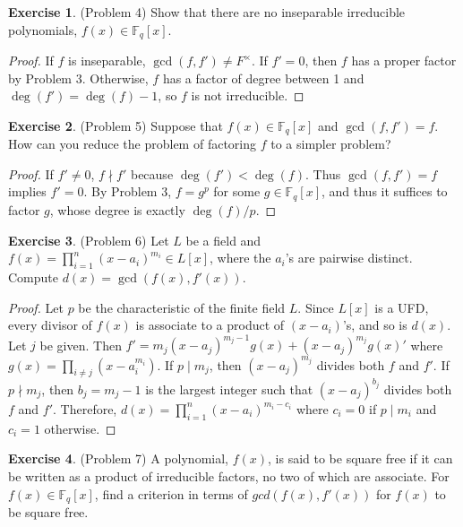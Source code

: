 \documentclass[12pt, psamsfonts]{amsart}
\theoremstyle{definition}
\newtheorem*{exer}{Exercise}
\theoremstyle{remark}
\numberwithin{equation}{section}
\begin{document}
\begin{exer}{(Problem 4)}
  Show that there are no inseparable irreducible polynomials, $f(x) \in \mathbb{F}_q[x]$.
\end{exer}

\begin{proof}
  If $f$ is inseparable, $\gcd(f, f') \ne F^{\times}$.
  If $f' = 0$, then $f$ has a proper factor by Problem 3.
  Otherwise, $f$ has a factor of degree between 1 and $\deg(f') = \deg(f) - 1$, so $f$ is not irreducible.
\end{proof}

\begin{exer}{(Problem 5)}
  Suppose that $f(x) \in \mathbb{F}_q[x]$ and $\gcd(f, f') = f$.
  How can you reduce the problem of factoring $f$ to a simpler problem?
\end{exer}

\begin{proof}
  If $f' \ne 0$, $f \nmid f'$ because $\deg(f') < \deg(f)$.
  Thus $\gcd(f, f') = f$ implies $f' = 0$.
  By Problem 3, $f = g^p$ for some $g \in \mathbb{F}_q[x]$, and thus it suffices to factor $g$, whose degree is exactly $\deg(f) / p$.
\end{proof}

\begin{exer}{(Problem 6)}
  Let $L$ be a field and $f(x) = \prod_{i=1}^{n} (x - a_i)^{m_i} \in L[x]$, where the $a_i$'s are pairwise distinct.
  Compute $d(x) = \gcd(f(x), f'(x))$.
\end{exer}

\begin{proof}
  Let $p$ be the characteristic of the finite field $L$.
  Since $L[x]$ is a UFD, every divisor of $f(x)$ is associate to a product of $(x - a_i)$'s, and so is $d(x)$.
  Let $j$ be given.
  Then $f' = m_j(x - a_j)^{m_j - 1}g(x) + (x - a_j)^{m_j}g(x)'$ where $g(x) = \prod_{i \ne j}(x - a_i^{m_i})$.
  If $p \mid m_j$, then $(x - a_j)^{m_j}$ divides both $f$ and $f'$.
  If $p \nmid m_j$, then $b_j = m_j - 1$ is the largest integer such that $(x - a_j)^{b_j}$ divides both $f$ and $f'$.
  Therefore, $d(x) = \prod_{i=1}^{n}(x - a_i)^{m_i - c_i}$ where $c_i = 0$ if $p \mid m_i$ and $c_i = 1$ otherwise.
\end{proof}

\begin{exer}{(Problem 7)}
  A polynomial, $f(x)$, is said to be square free if it can be written as a product of irreducible factors, no two of which are associate.
  For $f(x) \in \mathbb{F}_q[x]$, find a criterion in terms of $gcd(f(x), f'(x))$ for $f(x)$ to be square free.
\end{exer}
\end{document}
